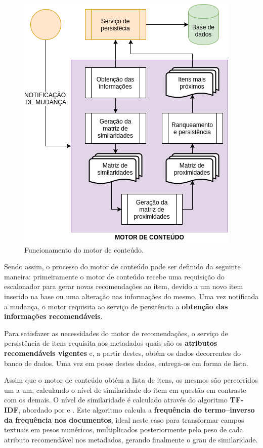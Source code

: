 \begin{figure}[h!tp]
	\caption{\label{content_engine}Funcionamento do motor de conteúdo.}
	\begin{center}
		\includegraphics[scale=0.8]{images/content_engine.png}
	\end{center}
	\hspace{5.5cm}{Fonte: O Autor.}
\end{figure}

Sendo assim, o processo do motor de conteúdo pode ser definido da seguinte maneira: primeiramente o motor de conteúdo recebe uma requisição do escalonador para gerar novas recomendações ao item, devido a um novo item inserido na base ou uma alteração nas informações do mesmo. Uma vez notificada a mudança, o motor requisita ao serviço de persitência a \textbf{obtenção das informações recomendáveis}.

Para satisfazer as necessidades do motor de recomendações, o serviço de persistência de itens requisita aos metadados quais são os \textbf{atributos recomendáveis vigentes} e, a partir destes, obtém os dados decorrentes do banco de dados. Uma vez em posse destes dados, entrega-os em forma de lista.

Assim que o motor de conteúdo obtém a lista de itens, os mesmos são percorridos um a um, calculando o nível de similaridade do item em questão em contraste com os demais. O nível de similaridade é calculado através do algoritmo \textbf{TF-IDF}, abordado por  e . Este algoritmo calcula a \textbf{frequência do termo–inverso da frequência nos documentos}, ideal neste caso para transformar campos textuais em pesos numéricos, multiplicados posteriormente pelo peso de cada atributo recomendável nos metadados, gerando finalmente o grau de similaridade.

